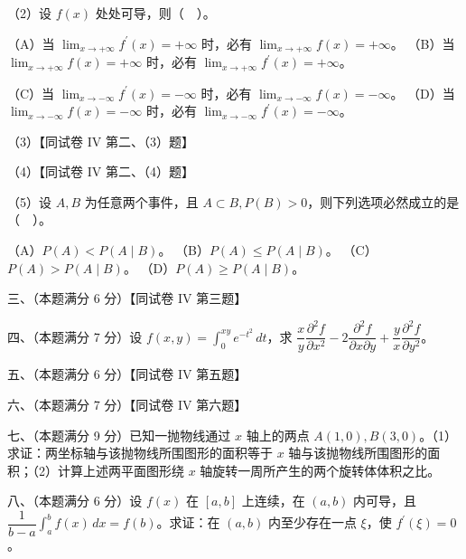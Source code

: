\documentclass[UTF8,12pt]{ctexart}
\begin{document}
（2）设 \(\displaystyle f(x)\) 处处可导，则（　）。


（A）当 \(\displaystyle \lim_{x\to+\infty}f^{\prime}(x)=+\infty\) 时，必有 \(\displaystyle \lim_{x\to+\infty}f(x)=+\infty\)。 （B）当 \(\displaystyle \lim_{x\to+\infty}f(x)=+\infty\) 时，必有 \(\displaystyle \lim_{x\to+\infty}f^{\prime}(x)=+\infty\)。


（C）当 \(\displaystyle \lim_{x\to-\infty}f^{\prime}(x)=-\infty\) 时，必有 \(\displaystyle \lim_{x\to-\infty}f(x)=-\infty\)。 （D）当 \(\displaystyle \lim_{x\to-\infty}f(x)=-\infty\) 时，必有 \(\displaystyle \lim_{x\to-\infty}f^{\prime}(x)=-\infty\)。


（3）【同试卷 IV 第二、（3）题】


（4）【同试卷 IV 第二、（4）题】


（5）设 \(\displaystyle A,\allowbreak B\) 为任意两个事件，且 \(\displaystyle A\subset B,\allowbreak  P(B)>0\)，则下列选项必然成立的是（　）。


（A）\(\displaystyle P(A)<P(A\mid B)\)。 （B）\(\displaystyle P(A)\leq P(A\mid B)\)。 （C）\(\displaystyle P(A)>P(A\mid B)\)。 （D）\(\displaystyle P(A)\geq P(A\mid B)\)。


三、（本题满分 6 分）【同试卷 IV 第三题】


四、（本题满分 7 分）设 \(\displaystyle f(x,\allowbreak y)=\displaystyle \int_0^{xy}e^{-t^2}\,dt\)，求 \(\displaystyle \dfrac{\displaystyle x}{\displaystyle y}\dfrac{\displaystyle \partial^2f}{\displaystyle \partial x^2}-2\dfrac{\displaystyle \partial^2f}{\displaystyle \partial x\partial y}+\dfrac{\displaystyle y}{\displaystyle x}\dfrac{\displaystyle \partial^2f}{\displaystyle \partial y^2}\)。


五、（本题满分 6 分）【同试卷 IV 第五题】


六、（本题满分 7 分）【同试卷 IV 第六题】


七、（本题满分 9 分）已知一抛物线通过 \(\displaystyle x\) 轴上的两点 \(\displaystyle A(1,\allowbreak 0),\allowbreak B(3,\allowbreak 0)\)。（1）求证：两坐标轴与该抛物线所围图形的面积等于 \(\displaystyle x\) 轴与该抛物线所围图形的面积；（2）计算上述两平面图形绕 \(\displaystyle x\) 轴旋转一周所产生的两个旋转体体积之比。


八、（本题满分 6 分）设 \(\displaystyle f(x)\) 在 \(\displaystyle [a,\allowbreak b]\) 上连续，在 \(\displaystyle (a,\allowbreak b)\) 内可导，且 \(\displaystyle \dfrac{\displaystyle 1}{\displaystyle b-a}\displaystyle \int_a^b f(x)\,dx=f(b)\)。求证：在 \(\displaystyle (a,\allowbreak b)\) 内至少存在一点 \(\displaystyle \xi\)，使 \(\displaystyle f^{\prime}(\xi)=0\)。
\end{document}

